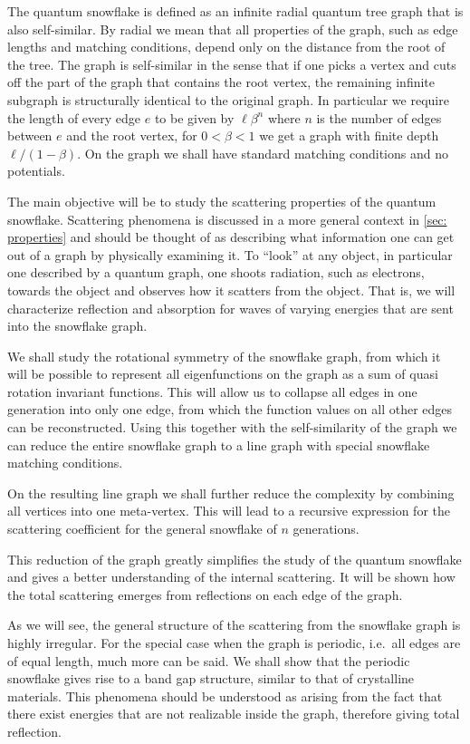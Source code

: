 The quantum snowflake is defined as an infinite radial quantum tree graph that is also self-similar. By radial we mean that all properties of the graph, such as edge lengths and matching conditions, depend only on the distance from the root of the tree. The graph is self-similar in the sense that if one picks a vertex and cuts off the part of the graph that contains the root vertex, the remaining infinite subgraph is structurally identical to the original graph. In particular we require the length of every edge $e$ to be given by $\ell\beta^n$ where $n$ is the number of edges between $e$ and the root vertex, for $0<\beta<1$ we get a graph with finite depth $\ell/(1-\beta)$. On the graph we shall have standard matching conditions and no potentials.

The main objective will be to study the scattering properties of the quantum snowflake. Scattering phenomena is discussed in a more general context in \cref{sec: properties} and should be thought of as describing what information one can get out of a graph by physically examining it. To ``look'' at any object, in particular one described by a quantum graph, one shoots radiation, such as electrons, towards the object and observes how it scatters from the object. That is, we will characterize reflection and absorption for waves of varying energies that are sent into the snowflake graph.

We shall study the rotational symmetry of the snowflake graph, from which it will be possible to represent all eigenfunctions on the graph as a sum of quasi rotation invariant functions. This will allow us to collapse all edges in one generation into only one edge, from which the function values on all other edges can be reconstructed. Using this together with the self-similarity of the graph we can reduce the entire snowflake graph to a line graph with special snowflake matching conditions.

On the resulting line graph we shall further reduce the complexity by combining all vertices into one meta-vertex. This will lead to a recursive expression for the scattering coefficient for the general snowflake of $n$ generations.

This reduction of the graph greatly simplifies the study of the quantum snowflake and gives a better understanding of the internal scattering. It will be shown how the total scattering emerges from reflections on each edge of the graph.

As we will see, the general structure of the scattering from the snowflake graph is highly irregular. For the special case when the graph is periodic, i.e.\ all edges are of equal length, much more can be said. We shall show that the periodic snowflake gives rise to a band gap structure, similar to that of crystalline materials. This phenomena should be understood as arising from the fact that there exist energies that are not realizable inside the graph, therefore giving total reflection.

